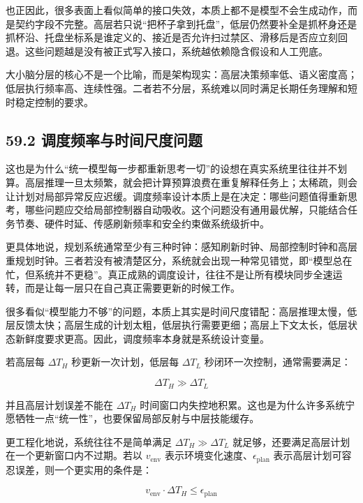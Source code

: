 也正因此，很多表面上看似简单的接口失效，本质上都不是模型不会生成动作，而是契约字段不完整。高层若只说“把杯子拿到托盘”，低层仍然要补全是抓杯身还是抓杯沿、托盘坐标系是谁定义的、接近是否允许扫过禁区、滑移后是否应立刻回退。这些问题越是没有被正式写入接口，系统越依赖隐含假设和人工兜底。

大小脑分层的核心不是一个比喻，而是架构现实：高层决策频率低、语义密度高；低层执行频率高、连续性强。二者若不分层，系统难以同时满足长期任务理解和短时稳定控制的要求。

\subsection*{59.2 调度频率与时间尺度问题}


这也是为什么“统一模型每一步都重新思考一切”的设想在真实系统里往往并不划算。高层推理一旦太频繁，就会把计算预算浪费在重复解释任务上；太稀疏，则会让计划对局部异常反应迟缓。调度频率设计本质上是在决定：哪些问题值得重新思考，哪些问题应交给局部控制器自动吸收。这个问题没有通用最优解，只能结合任务节奏、硬件时延、传感刷新频率和安全约束做系统级折中。

更具体地说，规划系统通常至少有三种时钟：感知刷新时钟、局部控制时钟和高层重规划时钟。三者若没有被清楚区分，系统就会出现一种常见错觉，即“模型总在忙，但系统并不更稳”。真正成熟的调度设计，往往不是让所有模块同步全速运转，而是让每一层只在自己真正需要更新的时候工作。

很多看似“模型能力不够”的问题，本质上其实是时间尺度错配：高层推理太慢，低层反馈太快；高层生成的计划太粗，低层执行需要更细；高层上下文太长，低层状态新鲜度要求更高。因此，调度频率本身就是系统设计变量。

若高层每 \(\Delta T_H\) 秒更新一次计划，低层每 \(\Delta T_L\) 秒闭环一次控制，通常需要满足：

\begin{equation*}
\Delta T_H \gg \Delta T_L
\end{equation*}

并且高层计划误差不能在 \(\Delta T_H\) 时间窗口内失控地积累。这也是为什么许多系统宁愿牺牲一点“统一性”，也要保留局部反射与中层技能缓存。

更工程化地说，系统往往不是简单满足 \(\Delta T_H \gg \Delta T_L\) 就足够，还要满足高层计划在一个更新窗口内不过期。若以 \(v_{\text{env}}\) 表示环境变化速度、\(\epsilon_{\text{plan}}\) 表示高层计划可容忍误差，则一个更实用的条件是：

\begingroup
\footnotesize
\begin{equation*}
v_{\text{env}} \cdot \Delta T_H \le \epsilon_{\text{plan}}
\end{equation*}
\endgroup

